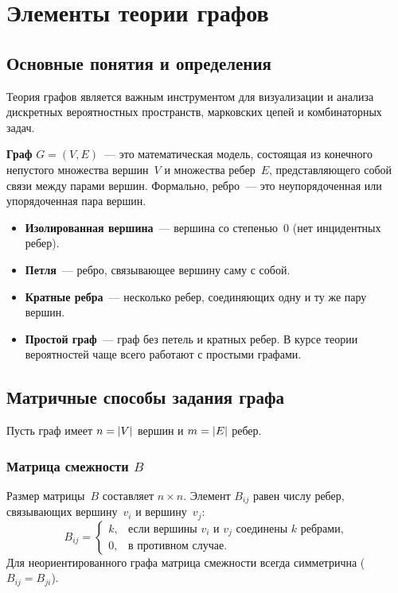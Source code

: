 \section{Элементы теории графов}

\subsection{Основные понятия и определения}
Теория графов является важным инструментом для визуализации и анализа дискретных вероятностных пространств, марковских цепей и комбинаторных задач.

\begin{definition}
\textbf{Граф} $G = (V, E)$~--- это математическая модель, состоящая из конечного непустого множества вершин~$V$ и множества ребер~$E$, представляющего собой связи между парами вершин. Формально, ребро~--- это неупорядоченная или упорядоченная пара вершин.
\end{definition}

\begin{itemize}
\item \textbf{Изолированная вершина}~--- вершина со степенью~0 (нет инцидентных ребер).
\item \textbf{Петля}~--- ребро, связывающее вершину саму с собой.
\item \textbf{Кратные ребра}~--- несколько ребер, соединяющих одну и ту же пару вершин.
\item \textbf{Простой граф}~--- граф без петель и кратных ребер. В курсе теории вероятностей чаще всего работают с простыми графами.
\end{itemize}

\subsection{Матричные способы задания графа}
Пусть граф имеет $n = \lvert V\rvert$ вершин и $m = \lvert E\rvert$ ребер.

\subsubsection{Матрица смежности \texorpdfstring{$B$}{B}}
Размер матрицы~$B$ составляет $n \times n$. Элемент $B_{ij}$ равен числу ребер, связывающих вершину~$v_i$ и вершину~$v_j$:
\[
B_{ij} = \begin{cases} k, & \text{если вершины } v_i \text{ и } v_j \text{ соединены } k \text{ ребрами}, \\ 0, & \text{в противном случае.} \end{cases}
\]
Для неориентированного графа матрица смежности всегда симметрична ($B_{ij} = B_{ji}$).

